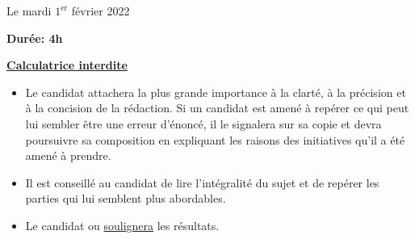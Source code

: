 \documentclass[twoside,french,11pt]{VcCours}
\begin{document}

\begin{center}
\large 
Le mardi $1^{\text{er}}$ février 2022

\bigskip
\textbf{Durée: 4h}

\bigskip
\large\underline{\textbf{Calculatrice interdite}}
\end{center}

\bigskip
\begin{itemize}
  \item Le candidat attachera la plus grande importance à la clarté, à la précision et à la concision de la rédaction. 
  Si un candidat est amené à repérer ce qui peut lui sembler être une erreur d'énoncé, il le signalera sur sa copie et 
  devra poursuivre sa composition en expliquant les raisons des initiatives qu'il a été amené à prendre.
  \item Il est conseillé au candidat de lire l'intégralité du sujet et de repérer les parties qui lui semblent plus abordables.
  \item Le candidat  ou \underline{soulignera} les résultats.
  \end{itemize}
\separationTitre


\newpage  
\end{document}
